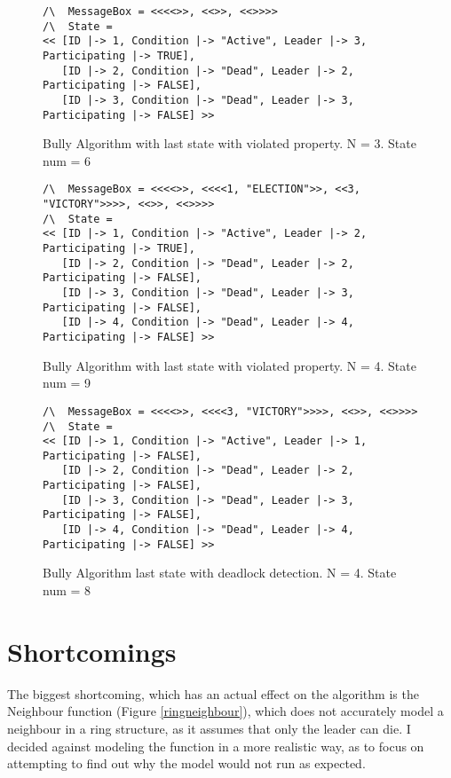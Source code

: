 \documentclass{report}
\begin{document}
\begin{figure}
\begin{lstlisting}
/\  MessageBox = <<<<>>, <<>>, <<>>>>
/\  State =
<< [ID |-> 1, Condition |-> "Active", Leader |-> 3, Participating |-> TRUE],
   [ID |-> 2, Condition |-> "Dead", Leader |-> 2, Participating |-> FALSE],
   [ID |-> 3, Condition |-> "Dead", Leader |-> 3, Participating |-> FALSE] >>
\end{lstlisting}


  \caption{Bully Algorithm with last state with violated property. N = 3. State num = 6}
  \label{bullyfailuren3}
\end{figure}

\begin{figure}
\begin{lstlisting}
/\  MessageBox = <<<<>>, <<<<1, "ELECTION">>, <<3, "VICTORY">>>>, <<>>, <<>>>>
/\  State =
<< [ID |-> 1, Condition |-> "Active", Leader |-> 2, Participating |-> TRUE],
   [ID |-> 2, Condition |-> "Dead", Leader |-> 2, Participating |-> FALSE],
   [ID |-> 3, Condition |-> "Dead", Leader |-> 3, Participating |-> FALSE],
   [ID |-> 4, Condition |-> "Dead", Leader |-> 4, Participating |-> FALSE] >>
\end{lstlisting}


  \caption{Bully Algorithm with last state with violated property. N = 4. State num = 9}
  \label{bullyfailuren4}
\end{figure}


\begin{figure}
\begin{lstlisting}
/\  MessageBox = <<<<>>, <<<<3, "VICTORY">>>>, <<>>, <<>>>>
/\  State =
<< [ID |-> 1, Condition |-> "Active", Leader |-> 1, Participating |-> FALSE],
   [ID |-> 2, Condition |-> "Dead", Leader |-> 2, Participating |-> FALSE],
   [ID |-> 3, Condition |-> "Dead", Leader |-> 3, Participating |-> FALSE],
   [ID |-> 4, Condition |-> "Dead", Leader |-> 4, Participating |-> FALSE] >>
\end{lstlisting}

  \caption{Bully Algorithm last state with deadlock detection. N = 4. State num = 8}
  \label{bullydeadlocksuccess}
\end{figure}

\section{Shortcomings}
The biggest shortcoming, which has an actual effect on the algorithm is the Neighbour function (Figure \ref{ringneighbour}), which does not accurately model a neighbour in a ring structure, as it assumes that only the leader can die. I decided against modeling the function in a more realistic way, as to focus on attempting to find out why the model would not run as expected.
\end{document}
